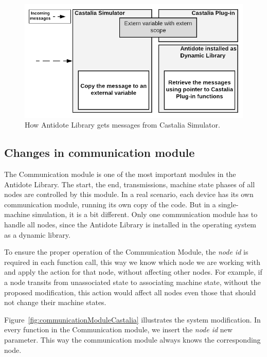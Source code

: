 \begin{figure}[htbp]
\centerline{\includegraphics[scale=0.35]{figures/castaliaPlugin.png}}
\caption{How Antidote Library gets messages from Castalia Simulator.}
\label{fig:CastaliaPlugin}
\end{figure}

\subsection{Changes in communication module}

The Communication module is one of the most important modules in the Antidote Library. The start, the end, transmissions, machine state phases of all nodes are controlled by this module. In a real scenario, each device has its own communication module, running its own copy of the code. But in a single-machine simulation, it is a bit different. Only one communication module has to handle all nodes, since the Antidote Library is installed in the operating system as a dynamic library.

To ensure the proper operation of the Communication Module, the \textit{node id} is required in each function call, this way we know which node we are working with and apply the action for that node, without affecting other nodes. For example, if a node transits from unassociated state to associating machine state, without the proposed modification, this action would affect all nodes even those that should not change their machine states.

Figure~\ref{fig:communicationModuleCastalia} illustrates the system modification. In every function in the Communication module, we insert the \textit{node id} new parameter. This way the communication module always knows the corresponding node. 

